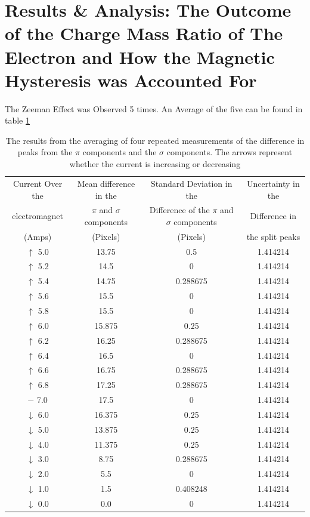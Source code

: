 \documentclass[a4paper,11pt]{article}
\begin{document}
\section{Results & Analysis: The Outcome of the Charge Mass Ratio of The Electron and How the Magnetic Hysteresis was Accounted For}
The Zeeman Effect was Observed 5 times. An Average of the five can be found in table \ref{tab:I hate Myself}
\begin{table}[hbt!]
    \centering
    \begin{tabular}{|c|c|c|c|}
    \hline
       Current Over the & Mean difference in the & Standard Deviation in the  & Uncertainty in the \\
         electromagnet & $\pi$ and $\sigma$ components & Difference of the $\pi$ and $\sigma$ components & Difference in \\
         (Amps) & (Pixels) & (Pixels) & the split peaks \\
         \hline\hline
         $\uparrow$ 5.0 & 13.75 & 0.5 & 1.414214\\
         $\uparrow$ 5.2 & 14.5 & 0 & 1.414214\\
         $\uparrow$ 5.4 & 14.75 & 0.288675 & 1.414214\\
         $\uparrow$ 5.6 & 15.5 & 0 & 1.414214\\
         $\uparrow$ 5.8 & 15.5 & 0 & 1.414214\\
         $\uparrow$ 6.0 & 15.875 & 0.25 & 1.414214\\
         $\uparrow$ 6.2 & 16.25 & 0.288675 & 1.414214\\
         $\uparrow$ 6.4 & 16.5 & 0 & 1.414214\\
         $\uparrow$ 6.6 & 16.75 & 0.288675 & 1.414214\\
         $\uparrow$ 6.8 & 17.25 & 0.288675 & 1.414214\\
         $-$ 7.0 & 17.5 & 0 & 1.414214\\
         $\downarrow$ 6.0 & 16.375 & 0.25 & 1.414214\\
         $\downarrow$ 5.0 & 13.875 & 0.25 & 1.414214\\
         $\downarrow$ 4.0 & 11.375 & 0.25 & 1.414214\\
         $\downarrow$ 3.0 & 8.75 & 0.288675 & 1.414214\\
         $\downarrow$ 2.0 & 5.5 & 0 & 1.414214\\
         $\downarrow$ 1.0 & 1.5 & 0.408248 & 1.414214\\
         $\downarrow$ 0.0 & 0.0 & 0 & 1.414214\\
         \hline
    \end{tabular}
    \caption{The results from the averaging of four repeated measurements of the difference in peaks from the $\pi$ components and the $\sigma$ components. The arrows represent whether the current is increasing or decreasing}
    \label{tab:I hate Myself}
\end{table}
\end{document}
